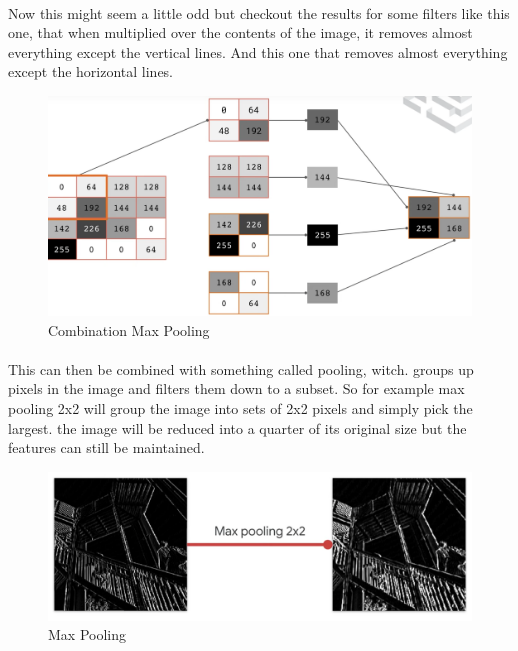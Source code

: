\documentclass{article}
\begin{document}
    \paragraph{}
    Now this might seem a little odd but checkout the results for some filters like this one, that when multiplied over the contents of the image, it removes almost everything except the vertical lines. And this one that removes almost everything except the horizontal lines.
    \vspace{10mm}
    \begin{figure}[h!]
      \begin{center}
        \includegraphics[width=0.7\linewidth]{img/comp.png}
        \caption{Combination Max Pooling}
        \label{fig:snn}
      \end{center}
    \end{figure}
    \paragraph{}
    This can then be combined with something called pooling, witch. groups up pixels in the image and filters them down to a subset. So for example max pooling 2x2 will group the image into sets of 2x2 pixels and simply pick the largest. the image will be reduced into a quarter of its original size but the features can still be maintained. 
    \vspace{40mm}
    \begin{figure}[h!]
      \begin{center}
        \includegraphics[width=0.7\linewidth]{img/maxpool.png}
        \caption{Max Pooling}
        \label{fig:snn}
      \end{center}
    \end{figure}
\end{document}
